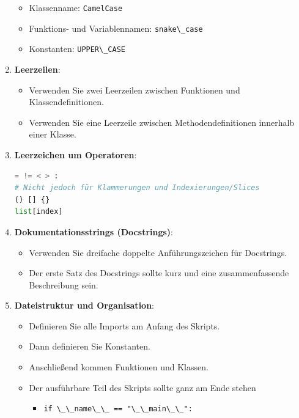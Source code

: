 \documentclass{vorlage-design-main}
\begin{document}
\begin{enumerate}
  \begin{itemize}
  
  \item
    Klassenname: \verb|CamelCase|
  \item
    Funktions- und Variablennamen: \verb|snake\_case|
  \item
    Konstanten: \verb|UPPER\_CASE|
  \end{itemize}
\item
  \textbf{Leerzeilen}:

  \begin{itemize}
  
  \item
    Verwenden Sie zwei Leerzeilen zwischen Funktionen und
    Klassendefinitionen.
  \item
    Verwenden Sie eine Leerzeile zwischen Methodendefinitionen innerhalb
    einer Klasse.
  \end{itemize}
\item
  \textbf{Leerzeichen um Operatoren}:

\begin{lstlisting}[language=Python]
= != < > :
# Nicht jedoch für Klammerungen und Indexierungen/Slices
() [] {}
list[index]
\end{lstlisting}
\item
  \textbf{Dokumentationsstrings (Docstrings)}:

  \begin{itemize}
  
  \item
    Verwenden Sie dreifache doppelte Anführungszeichen für Docstrings.
  \item
    Der erste Satz des Docstrings sollte kurz und eine zusammenfassende
    Beschreibung sein.
  \end{itemize}
\item
  \textbf{Dateistruktur und Organisation}:

  \begin{itemize}
  
  \item
    Definieren Sie alle Imports am Anfang des Skripts.
  \item
    Dann definieren Sie Konstanten.
  \item
    Anschließend kommen Funktionen und Klassen.
  \item
    Der ausführbare Teil des Skripts sollte ganz am Ende stehen

    \begin{itemize}
    
    \item
      \verb|if \_\_name\_\_ == "\_\_main\_\_":|
    \end{itemize}
  \end{itemize}
\end{enumerate}
\end{document}
